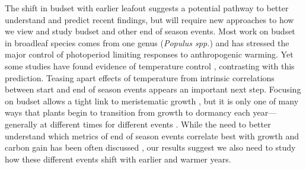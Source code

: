 \documentclass{article}[12pt]
\begin{document}
The shift in budset with earlier leafout suggests a potential pathway to better understand and predict recent findings, but will require new approaches to how we view and study budset and other end of season events. Most work on budset in broadleaf species comes from one genus (\emph{Populus spp.}) and has stressed the major control of photoperiod limiting responses to anthropogenic warming. Yet  some studies have found evidence of temperature control \citep{Olsen2014,Rohde2011,Michelson2018}, contrasting with this prediction. Teasing apart effects of temperature from intrinsic correlations between start and end of season events appears an important next step. Focusing on budset allows a tight link to meristematic growth \citep{soolanayakanahally2013timing}, but it is only one of many ways that plants begin to transition from growth to dormancy each year---generally at different times for different events \citep{Michelson2018}. While the need to better understand which metrics of end of season events correlate best with growth and carbon gain has been often discussed \citep{GALLINAT2015,Korner2023}, our results suggest we also need to study how these different events shift with earlier and warmer years. %

\end{document}
